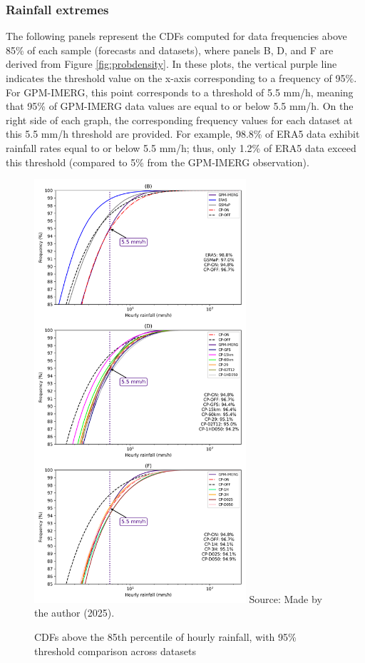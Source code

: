 \subsubsection{Rainfall extremes}

The following panels represent the CDFs computed for data frequencies above 85\% of each sample (forecasts and datasets), where panels B, D, and F are derived from Figure \ref{fig:probdensity}. In these plots, the vertical purple line indicates the threshold value on the x-axis corresponding to a frequency of 95\%. For GPM-IMERG, this point corresponds to a threshold of 5.5 mm/h, meaning that 95\% of GPM-IMERG data values are equal to or below 5.5 mm/h. On the right side of each graph, the corresponding frequency values for each dataset at this 5.5 mm/h threshold are provided. For example, 98.8\% of ERA5 data exhibit rainfall rates equal to or below 5.5 mm/h; thus, only 1.2\% of ERA5 data exceed this threshold (compared to 5\% from the GPM-IMERG observation).

\begin{figure}[!ht]
	\centering
	\caption{CDFs above the 85th percentile of hourly rainfall, with 95\% threshold comparison across datasets} %
	\includegraphics[width=0.7\textwidth]{docs/figuras/chapter5/85_percentile_CDF_FINAL.png} 
	\vspace{0.5em}
	Source: Made by the author (2025).  %
	\label{fig:probdensity2} %
\end{figure}

